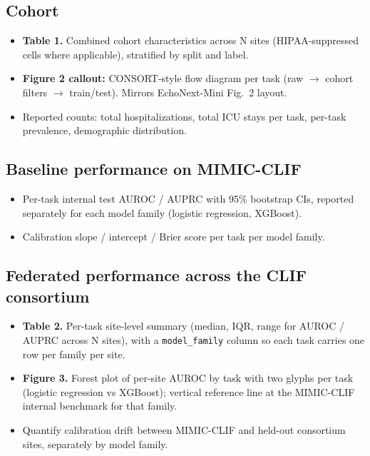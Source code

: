 \documentclass[11pt]{article}
\begin{document}
\subsection*{Cohort}
\begin{itemize}[leftmargin=1.5em]
  \item \textbf{Table 1.} Combined cohort characteristics across N sites
        (HIPAA-suppressed cells where applicable), stratified by split
        and label.
  \item \textbf{Figure 2 callout:} CONSORT-style flow diagram per task
        (raw $\to$ cohort filters $\to$ train/test). Mirrors EchoNext-Mini
        Fig.\ 2 layout.
  \item Reported counts: total hospitalizations, total ICU stays per task,
        per-task prevalence, demographic distribution.
\end{itemize}

\subsection*{Baseline performance on MIMIC-CLIF}
\begin{itemize}[leftmargin=1.5em]
  \item Per-task internal test AUROC / AUPRC with 95\% bootstrap CIs,
        reported separately for each model family (logistic regression,
        XGBoost).
  \item Calibration slope / intercept / Brier score per task per model
        family.
\end{itemize}

\subsection*{Federated performance across the CLIF consortium}
\begin{itemize}[leftmargin=1.5em]
  \item \textbf{Table 2.} Per-task site-level summary (median, IQR, range
        for AUROC / AUPRC across N sites), with a
        \texttt{model\_family} column so each task carries one row per
        family per site.
  \item \textbf{Figure 3.} Forest plot of per-site AUROC by task with
        two glyphs per task (logistic regression vs XGBoost); vertical
        reference line at the MIMIC-CLIF internal benchmark for that
        family.
  \item Quantify calibration drift between MIMIC-CLIF and held-out
        consortium sites, separately by model family.
\end{itemize}
\end{document}
